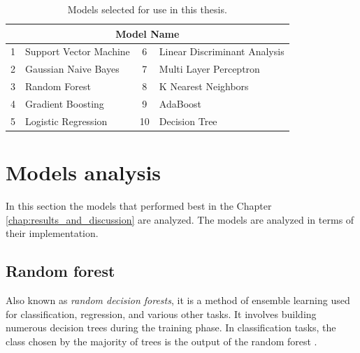         \begin{table}[htbp]
            \centering
            \begin{tabular}{@{}clcl@{}}
                \toprule
                \multicolumn{4}{c}{\textbf{Model Name}} \\
                \midrule
                1 & Support Vector Machine & 6 & Linear Discriminant Analysis \\
                2 & Gaussian Naive Bayes & 7 & Multi Layer Perceptron \\
                3 & Random Forest & 8 & K Nearest Neighbors \\
                4 & Gradient Boosting & 9 & AdaBoost \\
                5 & Logistic Regression & 10 & Decision Tree \\
                \bottomrule
            \end{tabular}
            \caption{Models selected for use in this thesis.}
            \label{tab:movements_table}
        \end{table}
    
    \section{Models analysis}
        
        In this section the models that performed best in the Chapter \ref{chap:results_and_discussion} are analyzed. The models are analyzed in terms of their implementation.

        \subsection{Random forest}
           Also known as \textit{random decision forests}, it is a method of ensemble learning used for classification, regression, and various other tasks. It involves building numerous decision trees during the training phase. In classification tasks, the class chosen by the majority of trees is the output of the random forest \cite{ho_random_1998}.

